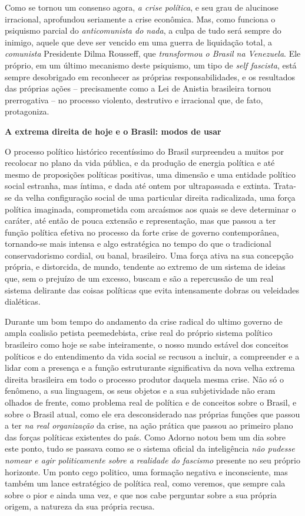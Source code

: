 Como se tornou um consenso agora, \emph{a crise política}, e seu grau de
alucinose irracional, aprofundou seriamente a crise econômica. Mas, como
funciona o psiquismo parcial do \emph{anticomunista do nada}, a culpa de
tudo será sempre do inimigo, aquele que deve ser vencido em uma guerra
de liquidação total, a \emph{comunista} Presidente Dilma Rousseff, que
\emph{transformou o Brasil na Venezuela}. Ele próprio, em um último
mecanismo deste psiquismo, um tipo de \emph{self fascista}, está sempre
desobrigado em reconhecer as próprias responsabilidades, e os resultados
das próprias ações -- precisamente como a Lei de Anistia brasileira
tornou prerrogativa -- no processo violento, destrutivo e irracional
que, de fato, protagoniza.

\textbf{A extrema direita de hoje e o Brasil: modos de usar}

O processo político histórico recentíssimo do Brasil surpreendeu a
muitos por recolocar no plano da vida pública, e da produção de energia
política e até mesmo de proposições políticas positivas, uma dimensão e
uma entidade político social estranha, mas íntima, e dada até ontem por
ultrapassada e extinta. Trata-se da velha configuração social de uma
particular direita radicalizada, uma força política imaginada,
comprometida com arcaísmos aos quais se deve determinar o caráter, até
então de pouca extensão e representação, mas que passou a ter função
política efetiva no processo da forte crise de governo contemporânea,
tornando-se mais intensa e algo estratégica no tempo do que o
tradicional conservadorismo cordial, ou banal, brasileiro. Uma força
ativa na sua concepção própria, e distorcida, de mundo, tendente ao
extremo de um sistema de ideias que, sem o prejuízo de um excesso,
buscam e são a repercussão de um real sistema delirante das coisas
políticas que evita intensamente dobras ou veleidades dialéticas.

Durante um bom tempo do andamento da crise radical do ultimo governo de
ampla coalisão petista peemedebista, crise real do próprio sistema
político brasileiro como hoje se sabe inteiramente, o nosso mundo
estável dos conceitos políticos e do entendimento da vida social se
recusou a incluir, a compreender e a lidar com a presença e a função
estruturante significativa da nova velha extrema direita brasileira em
todo o processo produtor daquela mesma crise. Não só o fenômeno, a sua
linguagem, os seus objetos e a sua subjetividade não eram olhados de
frente, como problema real de política e de conceitos sobre o Brasil, e
sobre o Brasil atual, como ele era desconsiderado nas próprias funções
que passou a ter \emph{na real organização} da crise, na ação prática
que passou ao primeiro plano das forças políticas existentes do país.
Como Adorno notou bem um dia sobre este ponto, tudo se passava como se o
sistema oficial da inteligência \emph{não pudesse nomear e agir
politicamente sobre a realidade do fascismo} presente no seu próprio
horizonte. Um ponto cego politico, uma formação negativa e inconsciente,
mas também um lance estratégico de política real, como veremos, que
sempre cala sobre o pior e ainda uma vez, e que nos cabe perguntar sobre
a sua própria origem, a natureza da sua própria recusa.

